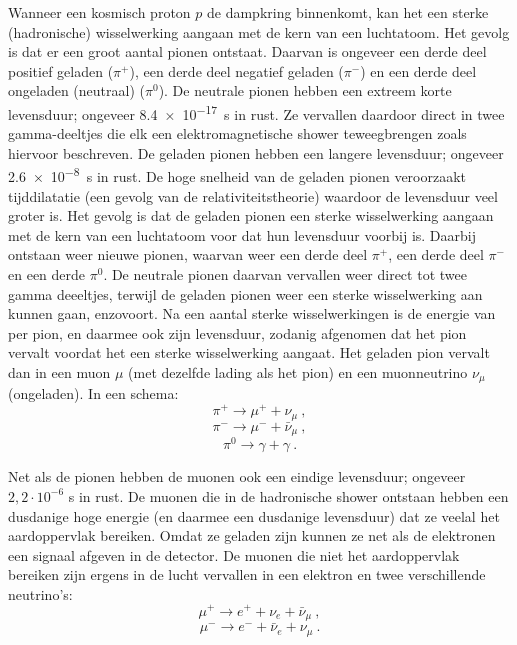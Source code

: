 Wanneer een kosmisch proton $p$ de dampkring binnenkomt, kan het een
sterke (hadronische) wisselwerking aangaan met de kern van een
luchtatoom. Het gevolg is dat er een groot aantal pionen ontstaat.
Daarvan is ongeveer een derde deel positief geladen ($\pi^+$), een
derde deel negatief geladen ($\pi^-$) en  een derde deel ongeladen
(neutraal) ($\pi^0$). De neutrale pionen hebben een extreem korte
levensduur; ongeveer \SI{8,4e-17}{\second} in rust. Ze vervallen daardoor
direct in twee gamma-deeltjes die elk een elektromagnetische shower
teweegbrengen zoals hiervoor beschreven. De geladen pionen hebben een
langere levensduur; ongeveer \SI{2,6e-8}{\second} in rust. De hoge snelheid
van de geladen pionen veroorzaakt tijddilatatie (een gevolg van de
relativiteitstheorie) waardoor de levensduur veel groter is. Het gevolg
is dat de geladen pionen een sterke wisselwerking aangaan met de kern
van een luchtatoom voor dat hun levensduur voorbij is. Daarbij ontstaan
weer nieuwe pionen, waarvan weer een derde deel $\pi^+$, een derde
deel $\pi^-$ en een derde $\pi^0$. De neutrale pionen daarvan
vervallen weer direct tot twee gamma deeeltjes, terwijl de geladen
pionen weer een sterke wisselwerking aan kunnen gaan, enzovoort. Na een
aantal sterke wisselwerkingen is de energie van per pion, en daarmee ook
zijn levensduur, zodanig afgenomen dat het pion vervalt voordat het een
sterke wisselwerking aangaat. Het geladen pion vervalt dan in een muon
$\mu$ (met dezelfde lading als het pion) en een muonneutrino $\nu_\mu$
(ongeladen). In een schema:
\begin{equation}
    \pi^+ \rightarrow \mu^+ + \nu_\mu \ , \nonumber
\end{equation}
\begin{equation}
    \pi^- \rightarrow \mu^- + \bar{\nu}_\mu \ , \nonumber
\end{equation}
\begin{equation}
    \pi^0 \rightarrow \gamma + \gamma \ . \nonumber
\end{equation}

Net als de pionen hebben de muonen ook een eindige levensduur; ongeveer
$2,2 \cdot 10^{-6}$ s in rust. De muonen die in de hadronische shower
ontstaan hebben een dusdanige hoge energie (en daarmee een dusdanige
levensduur) dat ze veelal het aardoppervlak bereiken. Omdat ze geladen
zijn kunnen ze net als de elektronen een signaal afgeven in de \hisparc
detector. De muonen die niet het aardoppervlak bereiken zijn ergens in
de lucht vervallen in een elektron en twee verschillende neutrino's:
\begin{equation}
    \mu^+ \rightarrow e^+ + \nu_e + \bar{\nu}_\mu \ , \nonumber
\end{equation}
\begin{equation}
    \mu^- \rightarrow e^- + \bar{\nu}_e + \nu_\mu \ . \nonumber
\end{equation}

